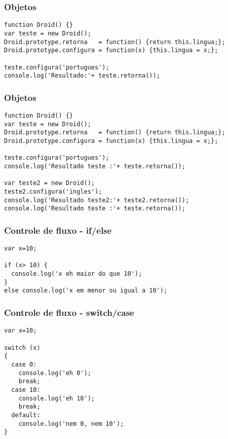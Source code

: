 \documentclass[14pt]{beamer}
\begin{document}
\begin{frame}[fragile]
 \frametitle{Objetos}
\begin{lstlisting}[basicstyle=\tiny\ttfamily]
function Droid() {}
var teste = new Droid();
Droid.prototype.retorna   = function() {return this.lingua;};
Droid.prototype.configura = function(x) {this.lingua = x;};

teste.configura('portugues');
console.log('Resultado:'+ teste.retorna());
\end{lstlisting}

\end{frame}

\begin{frame}[fragile]
 \frametitle{Objetos}
\begin{lstlisting}[basicstyle=\tiny\ttfamily]
function Droid() {}
var teste = new Droid();
Droid.prototype.retorna   = function() {return this.lingua;};
Droid.prototype.configura = function(x) {this.lingua = x;};

teste.configura('portugues');
console.log('Resultado teste :'+ teste.retorna());

var teste2 = new Droid();
teste2.configura('ingles');
console.log('Resultado teste2:'+ teste2.retorna());
console.log('Resultado teste :'+ teste.retorna());
\end{lstlisting}

\end{frame}

\begin{frame}[fragile]
 \frametitle{Controle de fluxo - if/else}
\begin{lstlisting}[basicstyle=\tiny\ttfamily]
var x=10;

if (x> 10) {
  console.log('x eh maior do que 10');
}
else console.log('x em menor ou igual a 10');
\end{lstlisting}

\end{frame}

\begin{frame}[fragile]
 \frametitle{Controle de fluxo - switch/case}
\begin{lstlisting}[basicstyle=\tiny\ttfamily]
var x=10;

switch (x)
{
  case 0:
	console.log('eh 0');
	break;
  case 10:
	console.log('eh 10');
	break;
  default:
	console.log('nem 0, nem 10');
}
\end{lstlisting}

\end{frame}
\end{document}
